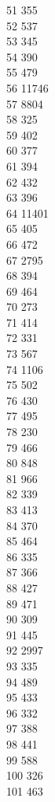 { 51	355 \\
 52	537 \\
 53	345 \\
 54	390 \\
 55	479 \\
 56	11746 \\
 57	8804 \\
 58	325 \\
 59	402 \\
 60	377 \\
 61	394 \\
 62	432 \\
 63	396 \\
 64	11401 \\
 65	405 \\
 66	472 \\
 67	2795 \\
 68	394 \\
 69	464 \\
 70	273 \\
 71	414 \\
 72	331 \\
 73	567 \\
 74	1106 \\
 75	502 \\
 76	430 \\
 77	495 \\
 78	230 \\
 79	466 \\
 80	848 \\
 81	966 \\
 82	339 \\
 83	413 \\
 84	370 \\
 85	464 \\
 86	335 \\
 87	366 \\
 88	427 \\
 89	471 \\
 90	309 \\
 91	445 \\
 92	2997 \\
 93	335 \\
 94	489 \\
 95	433 \\
 96	332 \\
 97	388 \\
 98	441 \\
 99	588 \\
 100	326 \\
 101	463 \\
}
